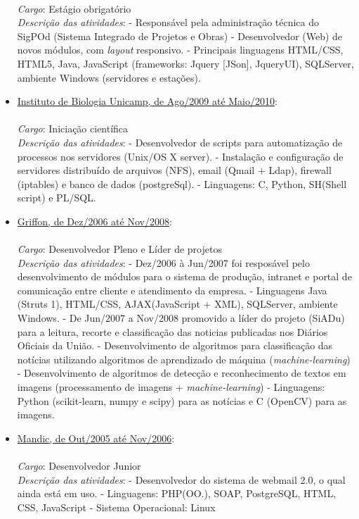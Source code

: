 \documentclass[a4paper,11pt]{article}
\begin{document}
\begin{itemize}
{\small \\  
  \emph{Cargo}: Estágio obrigatório\\
  \emph{Descrição das atividades}: 
  \subitem - Responsável pela administração técnica do SigPOd (Sistema Integrado de Projetos e Obras)
  \subitem - Desenvolvedor (Web) de novos módulos, com \textit{layout} responsivo.
  \subitem - Principais linguagens {HTML/CSS, HTML5, Java, JavaScript (frameworks: Jquery [JSon], JqueryUI), SQLServer}, ambiente Windows (servidores e estações).
}  
\item \underline{Instituto de Biologia Unicamp, de Ago/2009 até Maio/2010}: \\
  {\small \\ 
  \emph{Cargo}: Iniciação científica\\
  \emph{Descrição das atividades}: 
  \subitem - Desenvolvedor de scripts para automatização de processos nos servidores (Unix/OS X server).
  \subitem - Instalação e configuração de servidores distribuído de arquivos (NFS), email (Qmail + Ldap), firewall (iptables) e banco de dados (postgreSql).
  \subitem - Linguagens:  C, Python, SH(Shell script) e PL/SQL.\\
}

\item \underline{Griffon, de Dez/2006 até Nov/2008}: \\
{\small \\ 
  \emph{Cargo}: Desenvolvedor Pleno e Líder de projetos\\
  \emph{Descrição das atividades}: 
  \subitem - Dez/2006 à Jun/2007 foi resposável pelo desenvolvimento de módulos para o sistema de produção, intranet e portal de comunicação entre cliente e atendimento da empresa. 
  \subsubitem - Linguagens {Java (Struts 1), HTML/CSS, AJAX(JavaScript + XML), SQLServer}, ambiente Windows.
  \subitem - De Jun/2007 a Nov/2008 promovido a líder do projeto (SiADu) para a leitura, recorte e classificação das noticias publicadas nos Diários Oficiais da União.
	\subsubitem - Desenvolvimento de algoritmos para classificação das notícias utilizando algoritmos de aprendizado de máquina (\textit{machine-learning})
	\subsubitem - Desenvolvimento de algoritmos de detecção e reconhecimento de textos em imagens (processamento de imagens + \textit{machine-learning})
	\subsubitem - Linguagens: Python (scikit-learn, numpy e scipy) para as notícias e C (OpenCV) para as imagens.\\
}
\item \underline{Mandic, de Out/2005 até Nov/2006}:\\
{\small \\ 
	  \emph{Cargo}: Desenvolvedor Junior\\
	  \emph{Descrição das atividades}: 
	  \subitem - Desenvolvedor do sistema de webmail 2.0, o qual ainda está em uso. 
	  \subitem - Linguagens: PHP(OO.), SOAP, PostgreSQL, HTML, CSS, JavaScript 
	  \subitem - Sistema Operacional: Linux
}


\end{itemize}
\end{document}
